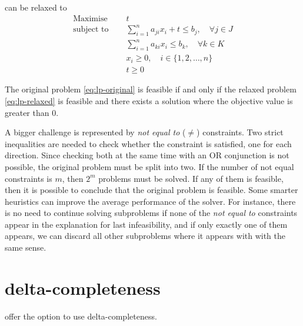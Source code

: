 \documentclass[runningheads]{llncs}
\begin{document}
can be relaxed to
\begin{equation}
    \label{eq:lp-relaxed}
    \begin{split}
        \text{Maximise }   \quad & t                                                             \\
        \text{subject to } \quad & \sum_{i=1}^{n} a_{ji}x_{i} + t \le b_j, \quad \forall j \in J \\
        \quad                    & \sum_{i=1}^{n} a_{ki}x_{i} \le b_k, \quad \forall k \in K     \\
                                 & x_i \ge 0 , \quad i \in \{1, 2, \ldots, n\}                   \\
                                 & t \ge 0
    \end{split}
\end{equation}

\begin{theorem}
    \label{thm:lp-relaxed}
    The original problem \eqref{eq:lp-original} is feasible if and only if the relaxed problem \eqref{eq:lp-relaxed} is feasible and there exists a solution where the objective value is greater than $0$.
\end{theorem}

A bigger challenge is represented by \textit{not equal to} ($\ne$) constraints.
Two strict inequalities are needed to check whether the constraint is satisfied, one for each direction.
Since checking both at the same time with an OR conjunction is not possible, the original problem must be split into two.
If the number of not equal constraints is $m$, then $2^m$ problems must be solved.
If any of them is feasible, then it is possible to conclude that the original problem is feasible.
Some smarter heuristics can improve the average performance of the solver.
For instance, there is no need to continue solving subproblems if none of the \textit{not equal to} constraints appear in the explanation for last infeasibility, and if only exactly one of them appears, we can discard all other subproblems where it appears with with the same sense.

\section{delta-completeness}

\dlinear offer the option to use delta-completeness.
\end{document}
